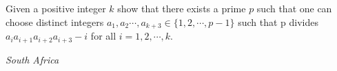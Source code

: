 Given a positive integer $k$ show that there exists a prime $p$ such that one can choose distinct integers $a_1,a_2\cdots, a_{k+3} \in \{1, 2, \cdots ,p-1\}$  such that p divides $a_ia_{i+1}a_{i+2}a_{i+3}-i$ for all $i= 1, 2, \cdots, k$.


\textit{South Africa }